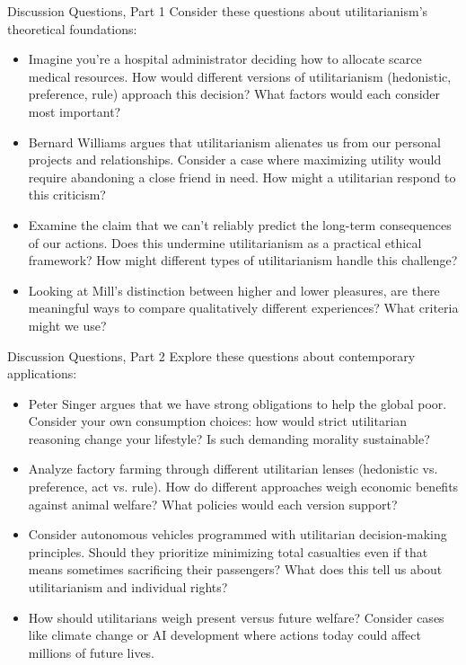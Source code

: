 \documentclass[aspectratio=169]{beamer}
\begin{document}
\begin{frame}{Discussion Questions, Part 1}
    Consider these questions about utilitarianism's theoretical foundations:
    \begin{itemize}
        \item Imagine you're a hospital administrator deciding how to allocate scarce medical resources. How would different versions of utilitarianism (hedonistic, preference, rule) approach this decision? What factors would each consider most important?
        
        \item Bernard Williams argues that utilitarianism alienates us from our personal projects and relationships. Consider a case where maximizing utility would require abandoning a close friend in need. How might a utilitarian respond to this criticism?
        
        \item Examine the claim that we can't reliably predict the long-term consequences of our actions. Does this undermine utilitarianism as a practical ethical framework? How might different types of utilitarianism handle this challenge?
        
        \item Looking at Mill's distinction between higher and lower pleasures, are there meaningful ways to compare qualitatively different experiences? What criteria might we use?
    \end{itemize}
\end{frame}

\begin{frame}{Discussion Questions, Part 2}
    Explore these questions about contemporary applications:
    \begin{itemize}
        \item Peter Singer argues that we have strong obligations to help the global poor. Consider your own consumption choices: how would strict utilitarian reasoning change your lifestyle? Is such demanding morality sustainable?
        
        \item Analyze factory farming through different utilitarian lenses (hedonistic vs. preference, act vs. rule). How do different approaches weigh economic benefits against animal welfare? What policies would each version support?
        
        \item Consider autonomous vehicles programmed with utilitarian decision-making principles. Should they prioritize minimizing total casualties even if that means sometimes sacrificing their passengers? What does this tell us about utilitarianism and individual rights?
        
        \item How should utilitarians weigh present versus future welfare? Consider cases like climate change or AI development where actions today could affect millions of future lives.
    \end{itemize}
\end{frame}
\end{document}

